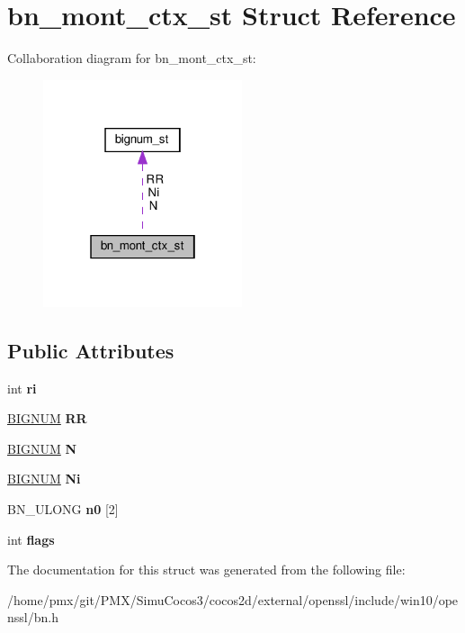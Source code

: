 \hypertarget{structbn__mont__ctx__st}{}\section{bn\+\_\+mont\+\_\+ctx\+\_\+st Struct Reference}
\label{structbn__mont__ctx__st}


Collaboration diagram for bn\+\_\+mont\+\_\+ctx\+\_\+st\+:
\nopagebreak
\begin{figure}[H]
\begin{center}
\leavevmode
\includegraphics[width=166pt]{structbn__mont__ctx__st__coll__graph}
\end{center}
\end{figure}
\subsection*{Public Attributes}
\begin{DoxyCompactItemize}
\item 
\mbox{\label{structbn__mont__ctx__st_a62ed733165c48fa02734f7374b81dbe3}} 
int {\bfseries ri}
\item 
\mbox{\label{structbn__mont__ctx__st_a80618d14450f431dfbd94cf22f603dda}} 
\hyperlink{structbignum__st}{B\+I\+G\+N\+UM} {\bfseries RR}
\item 
\mbox{\label{structbn__mont__ctx__st_ab39e1c073bfde3c58c515d52f129e5fb}} 
\hyperlink{structbignum__st}{B\+I\+G\+N\+UM} {\bfseries N}
\item 
\mbox{\label{structbn__mont__ctx__st_addf9ef45809c717971be3b8b724db8cd}} 
\hyperlink{structbignum__st}{B\+I\+G\+N\+UM} {\bfseries Ni}
\item 
\mbox{\label{structbn__mont__ctx__st_a728405e4c4ef9cf589c09b42afe109e0}} 
B\+N\+\_\+\+U\+L\+O\+NG {\bfseries n0} \mbox{[}2\mbox{]}
\item 
\mbox{\label{structbn__mont__ctx__st_a8b43cc0971930aacb1fb2188e610dc8c}} 
int {\bfseries flags}
\end{DoxyCompactItemize}


The documentation for this struct was generated from the following file\+:\begin{DoxyCompactItemize}
\item 
/home/pmx/git/\+P\+M\+X/\+Simu\+Cocos3/cocos2d/external/openssl/include/win10/openssl/bn.\+h\end{DoxyCompactItemize}
